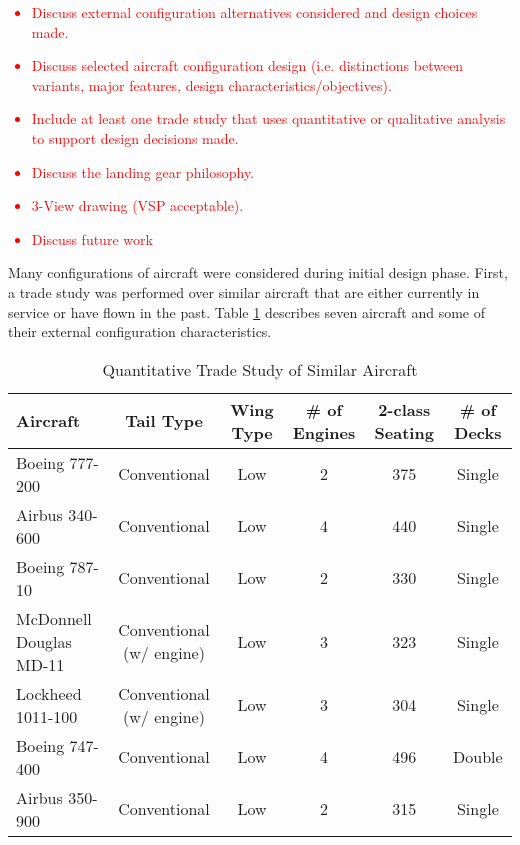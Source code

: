 \textcolor{red}{
\begin{itemize}
    \item Discuss external configuration alternatives considered and design choices made.
    \item Discuss selected aircraft configuration design (i.e. distinctions between variants, major features, design characteristics/objectives).
    \item Include at least one trade study that uses quantitative or qualitative analysis to support design decisions made.
    \item Discuss the landing gear philosophy.
    \item 3-View drawing (VSP acceptable).
    \item Discuss future work
\end{itemize}}

Many configurations of aircraft were considered during initial design phase. First, a trade study was performed over similar aircraft that are either currently in service or have flown in the past. Table \ref{tabmk1} describes seven aircraft and some of their external configuration characteristics. 

\begin{table}[H]
    \centering
    \caption{Quantitative Trade Study of Similar Aircraft}
    \begin{tabular}{|m{3cm}|c|c|c|c|c|}
    \hline
    \label{tabmk1}
    \textbf{Aircraft} & \textbf{Tail Type} & \textbf{Wing Type} & \textbf{\# of Engines} & \textbf{2-class Seating} & \textbf{\# of Decks} \\
    \hline
    Boeing 777-200 & Conventional & Low & 2 & 375 & Single \\
    \hline
    Airbus 340-600 & Conventional & Low & 4 & 440 & Single \\
    \hline
    Boeing 787-10 & Conventional & Low & 2 & 330 & Single \\
    \hline
    McDonnell Douglas MD-11 & Conventional (w/ engine) & Low & 3 & 323 & Single \\
    \hline
    Lockheed 1011-100 & Conventional (w/ engine) & Low & 3 & 304 & Single \\
    \hline
    Boeing 747-400 & Conventional & Low & 4 & 496 & Double \\
    \hline
    Airbus 350-900 & Conventional & Low & 2 & 315 & Single \\
    \hline
    \end{tabular}
\end{table}

